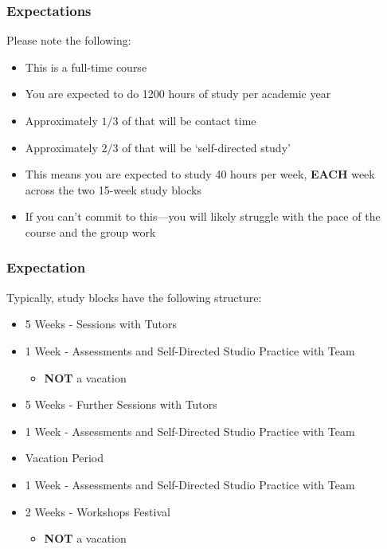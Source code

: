 \begin{frame}
	\frametitle{Expectations}
	
	Please note the following:
	
	\vspace{0.5em}
	
	\begin{itemize}
		\item This is a full-time course
		\item You are expected to do 1200 hours of study per academic year
		\item Approximately $1/3$ of that will be contact time
		\item Approximately $2/3$ of that will be `self-directed study'
		\item This means you are expected to study 40 hours per week, \textbf{EACH} week across the two 15-week study blocks
		\item If you can't commit to this---you will likely struggle with the pace of the course and the group work
	\end{itemize}

\end{frame}

\begin{frame}
	\frametitle{Expectation}
	
	Typically, study blocks have the following structure:
	
	\begin{itemize}
		\item 5 Weeks - Sessions with Tutors
		\item 1 Week - Assessments and Self-Directed Studio Practice with Team
		\begin{itemize}
			\item \textbf{NOT} a vacation
		\end{itemize}
		\item 5 Weeks - Further Sessions with Tutors
		\item 1 Week - Assessments and Self-Directed Studio Practice with Team
		\item Vacation Period
		\item 1 Week - Assessments  and Self-Directed Studio Practice with Team
		\item 2 Weeks - Workshops Festival
		\begin{itemize}
			\item \textbf{NOT} a vacation
		\end{itemize}
	\end{itemize}
	
\end{frame}

